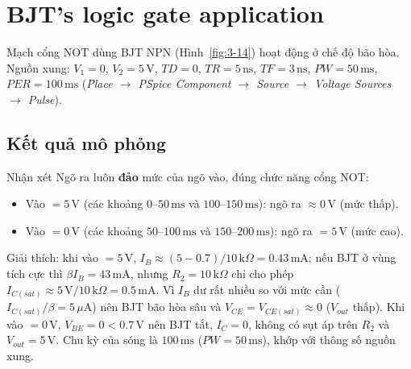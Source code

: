 \section{BJT's logic gate application}
Mạch cổng NOT dùng BJT NPN (Hình~\ref{fig:3-14}) hoạt động ở chế độ bão hòa. Nguồn xung: $V_1 = 0$, $V_2 = 5\,\text{V}$, $TD = 0$, $TR = 5\,\text{ns}$, $TF = 3\,\text{ns}$, $PW = 50\,\text{ms}$, $PER = 100\,\text{ms}$ (\textit{Place $\to$ PSpice Component $\to$ Source $\to$ Voltage Sources $\to$ Pulse}).


\subsection{Kết quả mô phỏng}

\begin{notebox}{Nhận xét}
Ngõ ra luôn \textbf{đảo} mức của ngõ vào, đúng chức năng cổng NOT:
\begin{itemize}[nosep]
  \item Vào $= 5\,\text{V}$ (các khoảng $0$--$50\,\text{ms}$ và $100$--$150\,\text{ms}$): ngõ ra $\approx 0\,\text{V}$ (mức thấp).
  \item Vào $= 0\,\text{V}$ (các khoảng $50$--$100\,\text{ms}$ và $150$--$200\,\text{ms}$): ngõ ra $= 5\,\text{V}$ (mức cao).
\end{itemize}
Giải thích: khi vào $= 5\,\text{V}$, $I_B \approx (5 - 0.7)/10\,\text{k}\Omega = 0.43\,\text{mA}$; nếu BJT ở vùng tích cực thì $\beta I_B = 43\,\text{mA}$, nhưng $R_2 = 10\,\text{k}\Omega$ chỉ cho phép $I_{C(sat)} \approx 5\,\text{V}/10\,\text{k}\Omega = 0.5\,\text{mA}$. Vì $I_B$ dư rất nhiều so với mức cần ($I_{C(sat)}/\beta = 5\,\mu\text{A}$) nên BJT bão hòa sâu và $V_{CE} = V_{CE(sat)} \approx 0$ ($V_{out}$ thấp). Khi vào $= 0\,\text{V}$, $V_{BE} = 0 < 0.7\,\text{V}$ nên BJT tắt, $I_C = 0$, không có sụt áp trên $R_2$ và $V_{out} = 5\,\text{V}$. Chu kỳ của sóng là $100\,\text{ms}$ ($PW = 50\,\text{ms}$), khớp với thông số nguồn xung.
\end{notebox}
